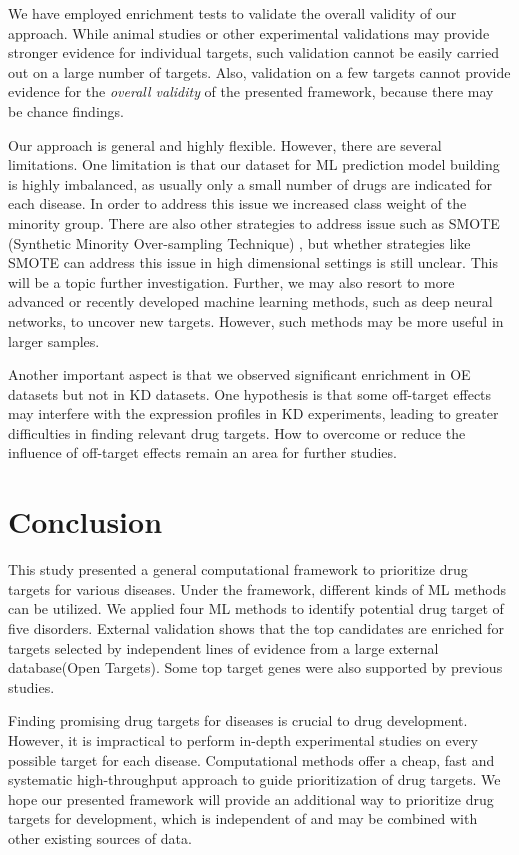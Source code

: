  We have employed enrichment tests to validate the overall validity of our approach. While animal studies or other experimental validations may provide stronger evidence for individual targets, such validation cannot be easily carried out on a large number of targets. Also, validation on a few targets cannot provide evidence for the \textit{overall validity }of the presented framework, because there may be chance findings. 

  Our approach is general and highly flexible. However, there are several limitations. One limitation is that our dataset for ML prediction model building is highly imbalanced, as usually only a small number of drugs are indicated for each disease. In order to address this issue we increased class weight of the minority group. There are also other strategies to address issue such as SMOTE (Synthetic Minority Over-sampling Technique) \cite{chawla2002smote}, but whether strategies like SMOTE can address this issue in high dimensional settings is still unclear. This will be a topic further investigation. Further, we may also resort to more advanced or recently developed machine learning methods, such as deep neural networks, to uncover new targets. However, such methods may be more useful in larger samples. 
  
  Another important aspect is that we observed significant enrichment in OE datasets but not in KD datasets.  One hypothesis is that some off-target effects may interfere with the expression profiles in KD experiments, leading to greater difficulties in finding relevant drug targets. How to overcome or reduce the influence of off-target effects remain an area for further studies. 

\section{Conclusion}
  This study presented a general computational framework to prioritize drug targets for various diseases. Under the framework, different kinds of ML methods can be utilized.  We applied four ML methods to identify potential drug target of five disorders. External validation shows that the top candidates are enriched for targets selected by independent lines of evidence from a large external database(Open Targets). Some top target genes were also supported by previous studies.
  
  Finding promising drug targets for diseases is crucial to drug development. However, it is impractical to perform in-depth experimental studies on every possible target for each disease. Computational methods offer a cheap, fast and systematic high-throughput approach to guide prioritization of drug targets. We hope our presented framework will provide an additional way to prioritize drug targets for development, which is independent of and may be combined with other existing sources of data.  
\chapterend